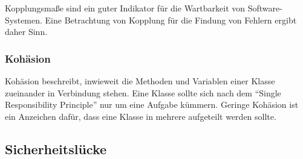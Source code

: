 Kopplungsmaße sind ein guter Indikator für die Wartbarkeit von Software-Systemen.
Eine Betrachtung von Kopplung für die Findung von Fehlern ergibt daher Sinn.

\subsubsection{Kohäsion}
Kohäsion beschreibt, inwieweit die Methoden und Variablen einer Klasse zueinander in Verbindung stehen.
Eine Klasse sollte sich nach dem "`Single Responsibility Principle"' nur um eine Aufgabe kümmern.
Geringe Kohäsion ist ein Anzeichen dafür, dass eine Klasse in mehrere aufgeteilt werden sollte.

\subsection{Sicherheitslücke}



